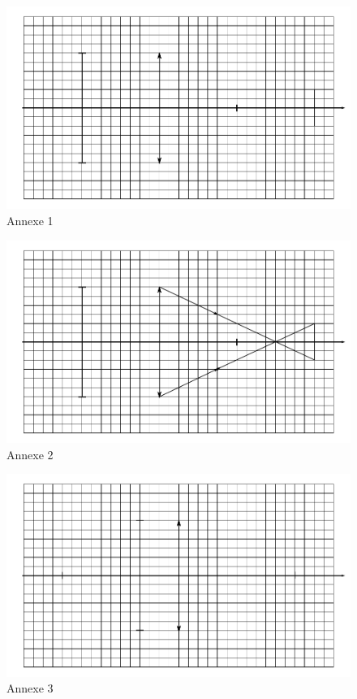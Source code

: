 \documentclass[a4paper, 11pt, garamond, oneside]{book}
\begin{document}
{	\vspace{-1.5cm}
	\begin{figure}[htbp]
		\centering
		\includegraphics[width=.8\linewidth]{annexe1}
		\caption{Annexe 1}
		\label{fig:gob1}
	\end{figure}
	\vspace{-1.5cm}
	\begin{figure}[htbp]
		\centering
		\includegraphics[width=.8\linewidth]{annexe1b}
		\caption{Annexe 2}
		\label{fig:gob2}
	\end{figure}
	\vspace{-1.5cm}
	\begin{figure}[htbp]
		\centering
		\includegraphics[width=.8\linewidth]{annexe2}
		\caption{Annexe 3}
		\label{fig:gob3}
	\end{figure}

}
\end{document}
